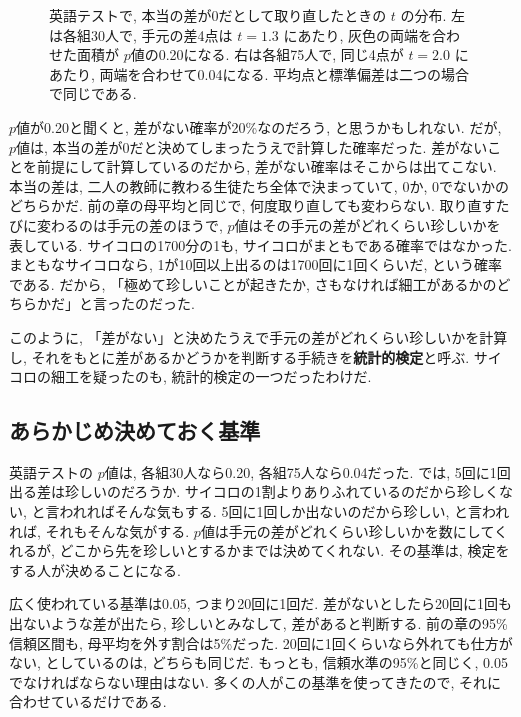     \begin{figure}[htbp]
      \centering
      
      \caption{英語テストで, 本当の差が0だとして取り直したときの $t$ の分布. 左は各組30人で, 手元の差4点は $t = 1.3$ にあたり, 灰色の両端を合わせた面積が $p$値の0.20になる. 右は各組75人で, 同じ4点が $t = 2.0$ にあたり, 両端を合わせて0.04になる. 平均点と標準偏差は二つの場合で同じである.}
      \label{fig:ch05-pvalue-tails}
    \end{figure}

    $p$値が0.20と聞くと, 差がない確率が20\%なのだろう, と思うかもしれない.
    だが, $p$値は, 本当の差が0だと決めてしまったうえで計算した確率だった.
    差がないことを前提にして計算しているのだから, 差がない確率はそこからは出てこない.
    本当の差は, 二人の教師に教わる生徒たち全体で決まっていて, 0か, 0でないかのどちらかだ.
    前の章の母平均と同じで, 何度取り直しても変わらない.
    取り直すたびに変わるのは手元の差のほうで, $p$値はその手元の差がどれくらい珍しいかを表している.
    サイコロの1700分の1も, サイコロがまともである確率ではなかった.
    まともなサイコロなら, 1が10回以上出るのは1700回に1回くらいだ, という確率である.
    だから, 「極めて珍しいことが起きたか, さもなければ細工があるかのどちらかだ」と言ったのだった.

    このように, 「差がない」と決めたうえで手元の差がどれくらい珍しいかを計算し, それをもとに差があるかどうかを判断する手続きを\textbf{統計的検定}と呼ぶ.
    サイコロの細工を疑ったのも, 統計的検定の一つだったわけだ.

  \subsection{あらかじめ決めておく基準}

    英語テストの $p$値は, 各組30人なら0.20, 各組75人なら0.04だった.
    では, 5回に1回出る差は珍しいのだろうか.
    サイコロの1割よりありふれているのだから珍しくない, と言われればそんな気もする.
    5回に1回しか出ないのだから珍しい, と言われれば, それもそんな気がする.
    $p$値は手元の差がどれくらい珍しいかを数にしてくれるが, どこから先を珍しいとするかまでは決めてくれない.
    その基準は, 検定をする人が決めることになる.

    広く使われている基準は0.05, つまり20回に1回だ.
    差がないとしたら20回に1回も出ないような差が出たら, 珍しいとみなして, 差があると判断する.
    前の章の95\%信頼区間も, 母平均を外す割合は5\%だった.
    20回に1回くらいなら外れても仕方がない, としているのは, どちらも同じだ.
    もっとも, 信頼水準の95\%と同じく, 0.05でなければならない理由はない.
    多くの人がこの基準を使ってきたので, それに合わせているだけである.

